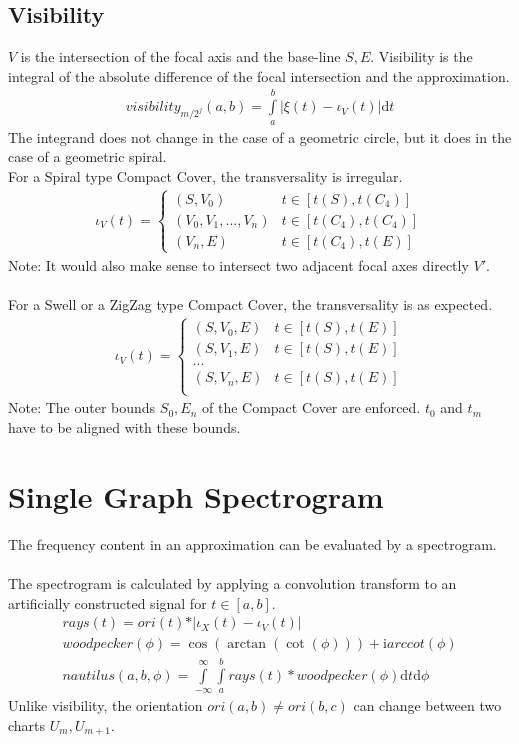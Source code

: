 \documentclass{report}
\begin{document}
\section{Visibility}
$V$ is the intersection of the focal axis and the base-line $S,E$. Visibility is the integral of the absolute difference of the focal intersection and the approximation.
\begin{align}
visibility_{m/2^j}(a,b)= \int \limits _{a}^{b} \vert \xi(t)-\iota_{V}(t)\vert  \mathrm{d}t
\end{align}
The integrand does not change in the case of a geometric circle, but it does in the case of a geometric spiral.\\
For a Spiral type Compact Cover, the transversality is irregular.
\begin{align*}
\iota_{V}(t) =
\begin{cases}
(S,V_{0}) & t \in [t(S),t(C_{4})]\\
(V_{0},V_{1}, ... , V_{n}) & t \in [t(C_{4}),t(C_{4})]\\
(V_{n},E) & t \in [t(C_{4}),t(E)]
\end{cases}
\end{align*}
Note: It would also make sense to intersect two adjacent focal axes directly $V'$.\\\\
For a Swell or a ZigZag type Compact Cover, the transversality is as expected.
\begin{align*}
\iota_{V}(t) =
\begin{cases}
(S,V_{0},E) & t \in [t(S),t(E)]\\
(S,V_{1},E) & t \in [t(S),t(E)]\\
...\\
(S,V_{n},E) & t \in [t(S),t(E)]\\
\end{cases}
\end{align*}
Note: The outer bounds $S_{0},E_{n}$ of the Compact Cover are enforced. $t_{0}$ and $t_{m}$ have to be aligned with these bounds.

\chapter{Single Graph Spectrogram}
The frequency content in an approximation can be evaluated by a spectrogram.\\\\
The spectrogram is calculated by applying a convolution transform to an artificially constructed signal for $t \in [a,b]$.
\begin{align}
rays(t)=ori(t)*\vert\iota_{X}(t)-\iota_{V}(t)\vert\\
woodpecker(\phi)=\cos(\arctan(\cot(\phi))) + \mathrm{i} arccot(\phi)\\
nautilus(a,b,\phi)=\int \limits _{-\infty}^{\infty}\int \limits _{a}^{b}rays(t)*woodpecker(\phi)\mathrm{d}t\mathrm{d}\phi
\end{align}
Unlike visibility, the orientation $ori(a,b)\neq ori(b,c)$ can change between two charts $U_{m},U_{m+1}$.
\end{document}
